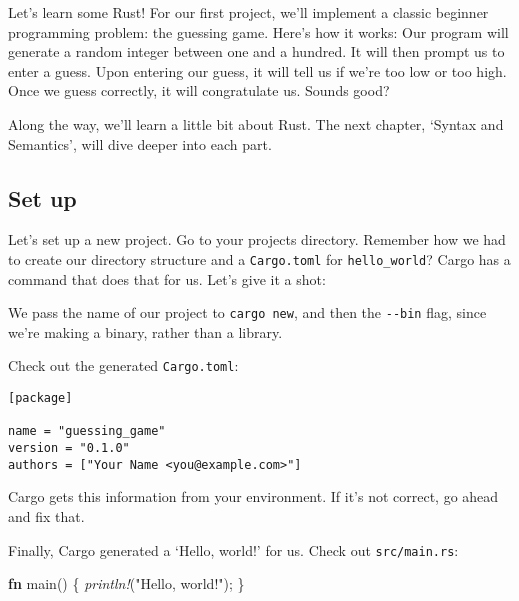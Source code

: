 \documentclass[a4paper,]{book}
\newenvironment{Shaded}{\begin{snugshade}}{\end{snugshade}}
\newcommand{\KeywordTok}[1]{\textcolor[rgb]{0.13,0.29,0.53}{\textbf{{#1}}}}
\newcommand{\StringTok}[1]{\textcolor[rgb]{0.31,0.60,0.02}{{#1}}}
\newcommand{\PreprocessorTok}[1]{\textcolor[rgb]{0.56,0.35,0.01}{\textit{{#1}}}}
\newcommand{\NormalTok}[1]{{#1}}
\begin{document}
Let's learn some Rust! For our first project, we'll implement a classic
beginner programming problem: the guessing game. Here's how it works:
Our program will generate a random integer between one and a hundred. It
will then prompt us to enter a guess. Upon entering our guess, it will
tell us if we're too low or too high. Once we guess correctly, it will
congratulate us. Sounds good?

Along the way, we'll learn a little bit about Rust. The next chapter,
`Syntax and Semantics', will dive deeper into each part.

\subsection{Set up}\label{set-up}

Let's set up a new project. Go to your projects directory. Remember how
we had to create our directory structure and a \texttt{Cargo.toml} for
\texttt{hello\_world}? Cargo has a command that does that for us. Let's
give it a shot:

\begin{Shaded}
\end{Shaded}

We pass the name of our project to \texttt{cargo\ new}, and then the
\texttt{-\/-bin} flag, since we're making a binary, rather than a
library.

Check out the generated \texttt{Cargo.toml}:

\begin{verbatim}
[package]

name = "guessing_game"
version = "0.1.0"
authors = ["Your Name <you@example.com>"]
\end{verbatim}

Cargo gets this information from your environment. If it's not correct,
go ahead and fix that.

Finally, Cargo generated a `Hello, world!' for us. Check out
\texttt{src/main.rs}:

\begin{Shaded}
\begin{Highlighting}[]
\KeywordTok{fn} \NormalTok{main() \{}
    \PreprocessorTok{println!}\NormalTok{(}\StringTok{"Hello, world!"}\NormalTok{);}
\NormalTok{\}}
\end{Highlighting}
\end{Shaded}
\end{document}
